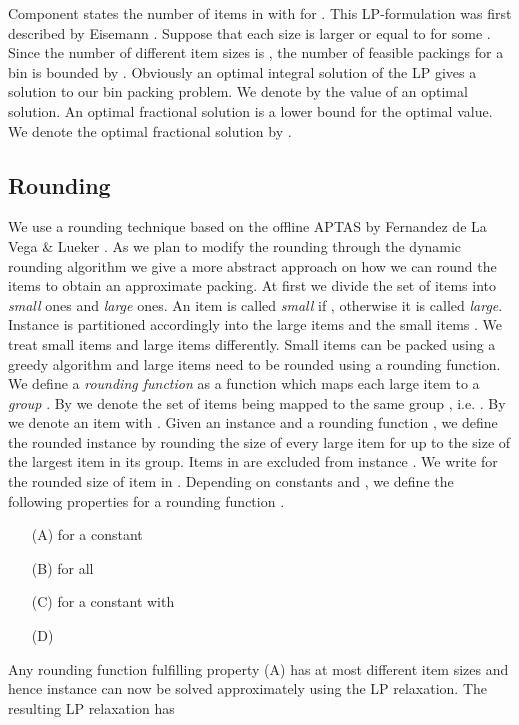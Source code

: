 \documentclass[a4paper,11pt]{article}
\begin{document}
Component  states the number of items  in  with  for .
This LP-formulation was first described by Eisemann
\cite{eisemann1957trim}. Suppose that each size  is larger or equal to
 for some . Since the number of different item sizes is ,
the number of feasible packings for a bin is bounded by .
Obviously an optimal integral solution of the LP gives a solution to our bin packing problem. We denote
by  the value of an optimal solution. An optimal fractional solution is a lower bound 
for the optimal value. We denote the optimal fractional solution by .





\subsection{Rounding}
We use a rounding technique based on the offline APTAS by Fernandez de La Vega \&
Lueker \cite{de1981bin}. As we plan to modify the rounding through the dynamic rounding algorithm we give a 
more abstract approach on how we can
round the items to obtain an approximate packing.
At first we divide the set of items into \emph{small} ones and
\emph{large} ones. An item  is called \emph{small} if , otherwise it is called \emph{large}. Instance  is partitioned accordingly
into the large items  and the small items .
We treat small items and large items differently. Small items can be packed using a greedy algorithm
and large items need to be rounded using a rounding function.
We define a \emph{rounding function} as a function  which maps each large item 
to a \emph{group} . By  we denote the set of items being mapped to the same 
group , i.e.
. By  we denote an item  with 
.
Given an instance  and a rounding function , we define the rounded instance  by rounding the size of 
every large item  for  up to the size  of the largest item in its group. 
Items in  are
excluded from instance . We write  for the rounded size of item  in .
Depending on constants  and , we define the following properties for a rounding function .
\begin{itemize}
\item[(A)]  for a constant 
\item[(B)]  for all 
\item[(C)]  for a constant  with 
\item[(D)]  
\end{itemize}
Any rounding function fulfilling property (A) has at most  different item sizes and hence 
instance
 can now be solved approximately using the LP relaxation. The resulting LP relaxation has  
\end{document}
